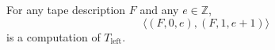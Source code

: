 For any tape description $F$ and any $e \in \mathbb{Z}$,
\[
\langle (F, 0, e), (F, 1, e + 1) \rangle
\]
is a computation of $T_{\text{left}}$.
